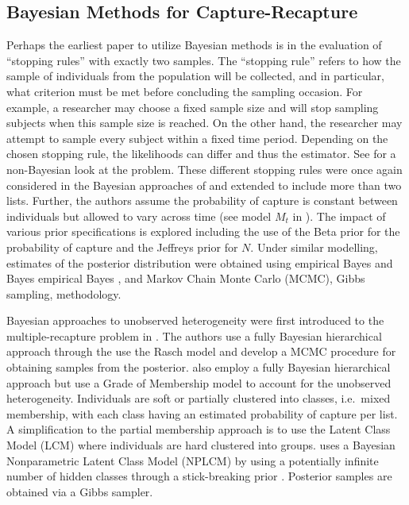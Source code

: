 \documentclass[
  12pt,
]{article}
\begin{document}
\subsection{Bayesian Methods for Capture-Recapture}

Perhaps the earliest paper to utilize Bayesian methods is
\cite{roberts_informative_1967} in the evaluation of ``stopping rules''
with exactly two samples. The ``stopping rule'' refers to how the sample
of individuals from the population will be collected, and in particular,
what criterion must be met before concluding the sampling occasion. For
example, a researcher may choose a fixed sample size and will stop
sampling subjects when this sample size is reached. On the other hand,
the researcher may attempt to sample every subject within a fixed time
period. Depending on the chosen stopping rule, the likelihoods can
differ and thus the estimator. See
\cite{chapman_estimation_1954,darroch_multiple-recapture_1958} for a
non-Bayesian look at the problem. These different stopping rules were
once again considered in the Bayesian approaches of
\cite{castledine_bayesian_1981} and extended to include more than two
lists. Further, the authors assume the probability of capture is
constant between individuals but allowed to vary across time (see model
\(M_t\) in \cite{otis_statistical_1978}). The impact of various prior
specifications is explored including the use of the Beta prior for the
probability of capture and the Jeffreys prior
\citep{jeffreys_theory_1967} for \(N\). Under similar modelling,
estimates of the posterior distribution were obtained using empirical
Bayes and Bayes empirical Bayes \citep{smith_bayesian_1991}, and Markov
Chain Monte Carlo (MCMC), Gibbs sampling,
\citep{george_capture-recapture_1992} methodology.

Bayesian approaches to unobserved heterogeneity were first introduced to
the multiple-recapture problem in \cite{fienberg_classical_1999}. The
authors use a fully Bayesian hierarchical approach through the use the
Rasch model and develop a MCMC procedure for obtaining samples from the
posterior. \cite{manrique-vallier_population_2008} also employ a fully
Bayesian hierarchical approach but use a Grade of Membership model
\citep{woodbury_mathematical_1978} to account for the unobserved
heterogeneity. Individuals are soft or partially clustered into classes,
i.e.~mixed membership, with each class having an estimated probability
of capture per list. A simplification to the partial membership approach
is to use the Latent Class Model (LCM) where individuals are hard
clustered into groups. \citep{manriquevallier_bayesian_2016} uses a
Bayesian Nonparametric Latent Class Model (NPLCM) by using a potentially
infinite number of hidden classes through a stick-breaking prior
\citep{dunson_kernel_2008}. Posterior samples are obtained via a Gibbs
sampler.
\end{document}
